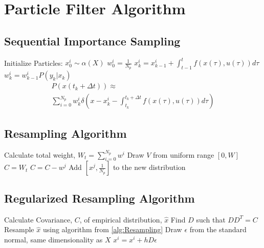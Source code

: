 \documentclass[journal]{./IEEEtran}
\begin{document}
\appendices

\section{Particle Filter Algorithm}
\label{sec:algorithms}

\subsection{Sequential Importance Sampling}
\label{alg:BasicParticleFilter}
\begin{algorithm}
\begin{algorithmic}
\STATE Initialize Particles:
    \STATE $x^i_0  \sim \alpha(X)$
    \STATE $w^i_0 = \frac{1}{N_p}$
\ENDFOR
{}
        \STATE $x^i_k = x^i_{k-1} + \int_{t-1}^t f(x(\tau), u(\tau)) d\tau $
        \STATE $w^i_k = w^i_{k-1}P(y_k | x_k)$
    \ENDFOR
\ENDFOR
\begin{equation*}
\begin{array}{l}
P(x(t_k+\Delta t)) \approx \\
\sum_{i=0}^{N_p} w^i_k \delta\left(x - x^i_k - \int_{t_k}^{t_k+\Delta t} f(x(\tau), u(\tau)) d\tau \right) 
\end{array}
\end{equation*}
\end{algorithmic}
\end{algorithm}

\subsection{Resampling Algorithm}
\label{alg:RegResampling}
\begin{algorithm}
\begin{algorithmic}
\STATE Calculate total weight, $W_t = \sum_{i=0}^{N_p} w^i$
    \STATE Draw $V$ from uniform range $[0, W]$
    \STATE $C = W_t$
        \STATE $C = C - w^j$
    \ENDFOR
    \STATE Add $[x^j, \frac{1}{N_p}]$ to the new distribution
\ENDFOR
\STATE 
\end{algorithmic}
\label{alg:Resampling}
\end{algorithm}

\subsection{Regularized Resampling Algorithm}
\label{alg:RegResampler}
\begin{algorithm}
\begin{algorithmic}
\STATE Calculate Covariance, $C$, of empirical distribution, $\hat{x}$
\STATE Find $D$ such that $DD^T = C$
\STATE Resample $\hat{x}$ using algorithm from \autoref{alg:Resampling}
    \STATE Draw $\epsilon$ from the standard normal, same dimensionality as $X$
    \STATE $x^i = x^i + hD\epsilon$
\ENDFOR
\end{algorithmic}
\end{algorithm}
\end{document}
